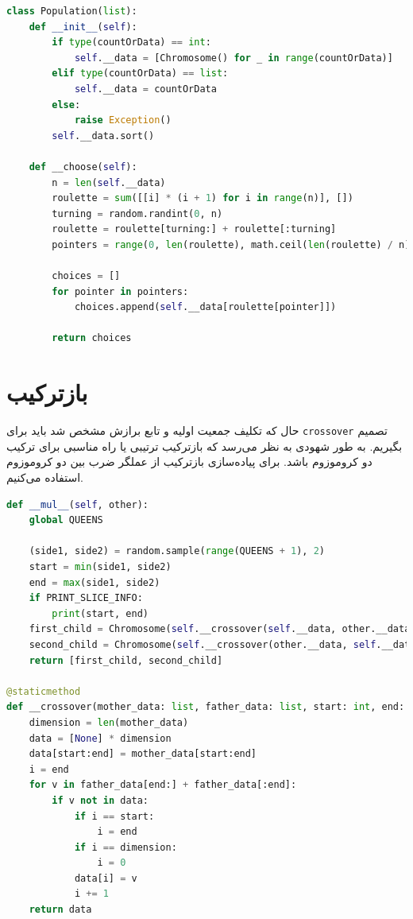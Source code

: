 \documentclass[a4paper, 12pt]{article}
\theoremstyle{definition}
\begin{document}
\LTR
\begin{lstlisting}[language=Python]
class Population(list):
    def __init__(self):
        if type(countOrData) == int:
            self.__data = [Chromosome() for _ in range(countOrData)]
        elif type(countOrData) == list:
            self.__data = countOrData
        else:
            raise Exception()
        self.__data.sort()

    def __choose(self):
        n = len(self.__data)
        roulette = sum([[i] * (i + 1) for i in range(n)], [])
        turning = random.randint(0, n)
        roulette = roulette[turning:] + roulette[:turning]
        pointers = range(0, len(roulette), math.ceil(len(roulette) / n))

        choices = []
        for pointer in pointers:
            choices.append(self.__data[roulette[pointer]])

        return choices
\end{lstlisting}
\RTL


\section{بازترکیب}
حال که تکلیف جمعیت اولیه و تابع برازش مشخص شد باید برای
\texttt{crossover}
تصمیم بگیریم. به طور شهودی به نظر می‌رسد که بازترکیب ترتیبی یا
راه مناسبی برای ترکیب دو کروموزوم باشد. برای پیاده‌سازی بازترکیب از عملگر ضرب بین دو کروموزوم استفاده می‌کنیم.

\LTR
\begin{lstlisting}[language=Python]
def __mul__(self, other):
    global QUEENS

    (side1, side2) = random.sample(range(QUEENS + 1), 2)
    start = min(side1, side2)
    end = max(side1, side2)
    if PRINT_SLICE_INFO:
        print(start, end)
    first_child = Chromosome(self.__crossover(self.__data, other.__data, start, end))
    second_child = Chromosome(self.__crossover(other.__data, self.__data, start, end))
    return [first_child, second_child]

@staticmethod
def __crossover(mother_data: list, father_data: list, start: int, end: int):
    dimension = len(mother_data)
    data = [None] * dimension
    data[start:end] = mother_data[start:end]
    i = end
    for v in father_data[end:] + father_data[:end]:
        if v not in data:
            if i == start:
                i = end
            if i == dimension:
                i = 0
            data[i] = v
            i += 1
    return data
\end{lstlisting}
\RTL
\end{document}
